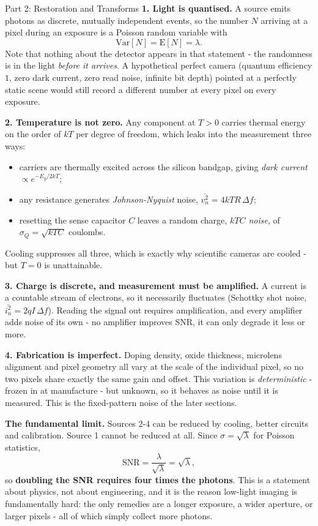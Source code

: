 \documentclass[letterpaper]{article}
\begin{document}
\begin{notes}{Part 2: Restoration and Transforms}
\textbf{1. Light is quantised.} A source emits photons as discrete, mutually independent events, so the number $N$ arriving at a pixel during an exposure is a Poisson random variable with
$$\mathrm{Var}[N] = \mathrm{E}[N] = \lambda.$$
Note that nothing about the detector appears in that statement - the randomness is in the light \emph{before it arrives}. A hypothetical perfect camera (quantum efficiency $1$, zero dark current, zero read noise, infinite bit depth) pointed at a perfectly static scene would still record a different number at every pixel on every exposure.

\textbf{2. Temperature is not zero.} Any component at $T>0$ carries thermal energy on the order of $kT$ per degree of freedom, which leaks into the measurement three ways:
\begin{itemize}
    \item carriers are thermally excited across the silicon bandgap, giving \emph{dark current} $\propto e^{-E_g/2kT}$;
    \item any resistance generates \emph{Johnson-Nyquist} noise, $\overline{v_n^2} = 4kTR\,\Delta f$;
    \item resetting the sense capacitor $C$ leaves a random charge, \emph{$kTC$ noise}, of $\sigma_Q=\sqrt{kTC}$ coulombs.
\end{itemize}
Cooling suppresses all three, which is exactly why scientific cameras are cooled - but $T=0$ is unattainable.

\textbf{3. Charge is discrete, and measurement must be amplified.} A current is a countable stream of electrons, so it necessarily fluctuates (Schottky shot noise, $\overline{i_n^2}=2qI\,\Delta f$). Reading the signal out requires amplification, and every amplifier adds noise of its own - no amplifier improves SNR, it can only degrade it less or more.

\textbf{4. Fabrication is imperfect.} Doping density, oxide thickness, microlens alignment and pixel geometry all vary at the scale of the individual pixel, so no two pixels share exactly the same gain and offset. This variation is \emph{deterministic} - frozen in at manufacture - but unknown, so it behaves as noise until it is measured. This is the fixed-pattern noise of the later sections.

\textbf{The fundamental limit.} Sources 2-4 can be reduced by cooling, better circuits and calibration. Source 1 cannot be reduced at all. Since $\sigma=\sqrt\lambda$ for Poisson statistics,
$$\mathrm{SNR} = \frac{\lambda}{\sqrt{\lambda}} = \sqrt{\lambda},$$
so \textbf{doubling the SNR requires four times the photons}. This is a statement about physics, not about engineering, and it is the reason low-light imaging is fundamentally hard: the only remedies are a longer exposure, a wider aperture, or larger pixels - all of which simply collect more photons.


\end{notes}
\end{document}
